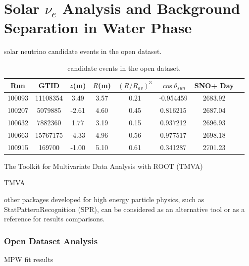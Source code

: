 \section{Solar $\nu_e$ Analysis and Background Separation in Water Phase}


solar neutrino candidate events in the open dataset.


\begin{table}[ht]
	\centering
	\caption{candidate events in the open dataset.}
	\label{opendata}
	\begin{tabular*}{155mm}{c@{\extracolsep{\fill}}ccccccc}
		\hline
	Run &  GTID &  $z$(m) & $R$(m)& $(R/R_{av})^3$ & $\cos\theta_{sun}$ & SNO+ Day\\
	\hline 
	100093 &11108354 &3.49 &3.57 &0.21 &-0.954459 &2683.92
\\
	100207 &5079885 &-2.61 &4.60 &0.45 &0.816215 &2687.04
\\
	100632 &7882360 &1.77 &3.19 &0.15 &0.937212 &2696.93
\\
	100663 &15767175 &-4.33& 4.96 &0.56 &0.977517 &2698.18
\\
	100915 &169700 &-1.00 &5.10 &0.61 &0.341287 &2701.23\\
		\hline
	\end{tabular*}
\end{table}













The Toolkit for Multivariate Data Analysis with ROOT (TMVA) \cite{tmvaWebsite}

TMVA 


other packages developed for high energy particle physics, such as StatPatternRecognition (SPR)\cite{sprWebsite}, can be considered as an alternative tool or as a reference for results comparisons. 

\subsubsection{Open Dataset Analysis}

MPW fit results











